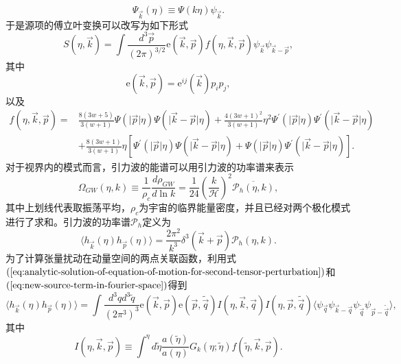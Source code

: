 \begin{equation}
  \Psi_{\vec{k}}(\eta) \equiv \Psi(k\eta)\psi_{\vec{k}}. 
\end{equation}
于是源项的傅立叶变换可以改写为如下形式
\begin{equation}
  \label{eq:new-source-term-in-fourier-space}
  S(\eta, \vec{k}) = \int \frac{d^3 \vec{p}}{{\left(2\pi \right)}^{3 /2}} 
  \mathrm{e}(\vec{k}, \vec{p})f(\eta, \vec{k}, \vec{p})
  \psi_{\vec{k}}\psi_{\vec{k}-\vec{p}},
\end{equation}
其中
\begin{equation}
  \mathrm{e}(\vec{k},\vec{p}) = \mathrm{e}^{ij}(\vec{k})p_{i}p_{j},
\end{equation}
以及
\begin{equation}
  \begin{split}
    f(\eta, \vec{k}, \vec{p}) = & \frac{8(3w+5)}{3(w+1)}
    \Psi(\lvert \vec{p}\rvert\eta)\Psi(\lvert \vec{k}-\vec{p}\rvert\eta) +
    \frac{4{\left(3w+1\right)}^2}{3(w+1)}\eta^2 \Psi^\prime(\lvert
    \vec{p}\rvert\eta) \Psi^\prime(\lvert \vec{k}-\vec{p}\rvert\eta) \\
    & + \frac{8(3w+1)}{3(w+1)}\eta 
    \left[ \Psi^\prime(\lvert \vec{p}\rvert \eta)\Psi(\lvert
    \vec{k}-\vec{p}\rvert\eta)+\Psi(\lvert
    \vec{p}\rvert\eta)\Psi^\prime(\lvert \vec{k}-\vec{p}\rvert\eta) \right].
  \end{split}
\end{equation}
对于视界内的模式而言，引力波的能谱可以用引力波的功率谱来表示
\begin{equation}
  \label{eq:energy-spectrum-for-GW-in-power-spectrum}
  \Omega_{GW}(\eta, k) \equiv \frac{1}{\rho_{c}} \frac{d\rho_{GW}}{d \ln k}
  = \frac{1}{24} {\left(\frac{k}{\mathcal{H}}\right)}^2
  \overline{\mathcal{P}_{h}(\eta, k)},
\end{equation}
其中上划线代表取振荡平均，$\rho_{c}$为宇宙的临界能量密度，并且已经对两个极化模式进行了求和。引力波的功率谱$\mathcal{P}_{h}$定义为
\begin{equation}
  \label{eq:power-spectrum-definition-of-GW}
  \langle h_{\vec{k}}(\eta)h_{\vec{p}}(\eta)\rangle = \frac{2\pi^2}{k^3} 
  \delta^3(\vec{k}+\vec{p})\mathcal{P}_{h}(\eta, k).
\end{equation}
为了计算张量扰动在动量空间的两点关联函数，利用式$(\ref{eq:analytic-solution-of-equation-of-motion-for-second-tensor-perturbation})$和$(\ref{eq:new-source-term-in-fourier-space})$得到
\begin{equation}
  \langle h_{\vec{k}}(\eta)h_{\vec{p}}(\eta)\rangle = \int
  \frac{d^3q d^3 \tilde{q}}{{\left(2\pi^3\right)}^3}
  \mathrm{e}(\vec{k},\vec{p})\mathrm{e}(\vec{p}, \tilde{\vec{q}})
  I(\eta, \vec{k},\vec{q})I(\eta, \vec{p}, \tilde{\vec{q}})
  \langle
  \psi_{\vec{q}}\psi_{\vec{k}-\vec{q}}\psi_{\tilde{\vec{q}}}\psi_{\vec{p}-\tilde{\vec{q}}}\rangle,
\end{equation}
其中
\begin{equation}
  I(\eta, \vec{k},\vec{p}) \equiv \int^{\eta} d \tilde{\eta}
  \frac{a(\tilde{\eta})}{a(\eta)} G_{k}(\eta;\tilde{\eta})f(\tilde{\eta},
  \vec{k}, \vec{p}).  
\end{equation}

